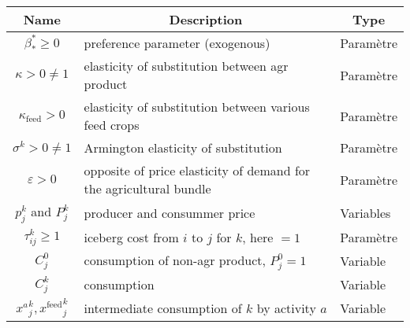 \begin{table}[h!]
    \begin{tabular}{c|l|l}
        \multicolumn{1}{c}{\textbf{Name}}           & \multicolumn{1}{|c|}{\textbf{Description}}                         & \multicolumn{1}{c}{\textbf{Type}} \\
        \hline
        $\beta_*^* \ge 0$                           & preference parameter (exogenous)                                   & Paramètre                         \\

        $\kappa > 0 \neq 1$                         & elasticity of substitution between agr product                     & Paramètre                         \\

        $\kappa_{\text{feed}} > 0$                  & elasticity of substitution between various feed crops              & Paramètre                         \\

        $\sigma^k > 0 \neq 1$                       & Armington elasticity of substitution                               & Paramètre                         \\

        $\varepsilon > 0$                           & opposite of price elasticity of demand for the agricultural bundle & Paramètre                         \\

        $p_j^k$ and $P_j^k$                         & producer and consummer price                                       & Variables                         \\

        $\tau_{ij}^k \ge 1$                         & iceberg cost from $i$ to $j$ for $k$, here $=1$                    & Paramètre                         \\

        $C_j^0$                                     & consumption of non-agr product, $P_j^0 = 1$                        & Variable                          \\

        $C_j^k$                                     & consumption                                                        & Variable                          \\

        ${x^a}_j^k, {x^\text{feed}}_j^k$            & intermediate consumption of $k$ by activity $a$                    & Variable                          \\


\end{tabular}
\end{table}

